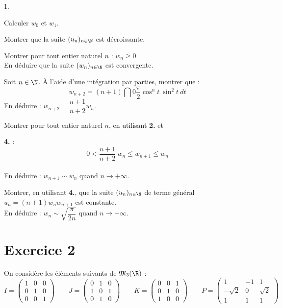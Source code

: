 \documentclass[11pt]{article}%
\begin{document}
\begin{noliste}{1.}
 \setlength{\itemsep}{4mm}
\item Calculer $w_{0}$ et $w_{1}$.

\item Montrer que la suite $(u_{n})_{n\in \N}$ est décroissante.

\item Montrer pour tout entier naturel $n$ : \qquad $w_{n}\geq 0$.\\
En déduire que la suite $(w_{n})_{n\in \N}$ est convergente.

\item Soit $n\in \N$. À l'aide d'une intégration par parties,
montrer que : 
\[
w_{n + 2} = (n + 1)\dint{0}{\dfrac{\pi }{2}}\cos ^{n}t\ \sin ^{2}t\ dt
\]
En déduire : \qquad $w_{n + 2} = \dfrac{n + 1}{n + 2}w_{n}$.

\item Montrer pour tout entier naturel $n$, en utilisant \textbf{2.} et

\textbf{4.} : 
\[
0<\dfrac{n + 1}{n + 2}\ w_{n}\leq w_{n + 1}\leq w_{n}
\]
\\
En déduire : \qquad $w_{n + 1}\sim w_{n}$ quand $n\rightarrow + \infty
$.

\item Montrer, en utilisant \textbf{4.}, que la suite $(u_{n})_{n\in
\N}$ de terme général $u_{n} = (n + 1)w_{n}w_{n + 1}$ est constante.\\
En déduire : \qquad $w_{n}\sim \sqrt{\dfrac{\pi }{2n}}$ quand
$n\rightarrow + \infty $.
\end{noliste}

\section*{Exercice 2}

\noindent On considère les éléments suivants de $\mathfrak{M}_{3}(\R)$
: 
\[
I = \left( 
\begin{array}{ccc}
1 & 0 & 0 \\
0 & 1 & 0 \\
0 & 0 & 1
\end{array}
\right) \qquad J = \left( 
\begin{array}{ccc}
0 & 1 & 0 \\
1 & 0 & 1 \\
0 & 1 & 0
\end{array}
\right) \qquad K = \left( 
\begin{array}{ccc}
0 & 0 & 1 \\
0 & 1 & 0 \\
1 & 0 & 0
\end{array}
\right) \qquad P = \left( 
\begin{array}{ccc}
1 & -1 & 1 \\
-\sqrt{2} & 0 & \sqrt{2} \\
1 & 1 & 1
\end{array}
\right)
\]
\end{document}
